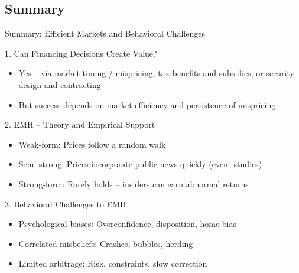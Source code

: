 \subsection*{Summary}
\begin{frame}{Summary: Efficient Markets and Behavioral Challenges}
	
	\begin{block}{1. Can Financing Decisions Create Value?}
		\small
		\begin{itemize}
			\item Yes -- via market timing / mispricing, tax benefits and subsidies, or security design and contracting
			\item But success depends on market efficiency and persistence of mispricing
		\end{itemize}
	\end{block}
	\vspace{-3mm}
	\begin{block}{2. EMH -- Theory and Empirical Support}
		\small
		\begin{itemize}
			\item Weak-form: Prices follow a random walk
			\item Semi-strong: Prices incorporate public news quickly (event studies)
			\item Strong-form: Rarely holds -- insiders can earn abnormal returns
		\end{itemize}
	\end{block}
	\vspace{-3mm}
	\begin{block}{3. Behavioral Challenges to EMH}
		\small
		\begin{itemize}
			\item Psychological biases: Overconfidence, disposition, home bias
			\item Correlated misbeliefs: Crashes, bubbles, herding
			\item Limited arbitrage: Risk, constraints, slow correction
		\end{itemize}
	\end{block}

\end{frame}